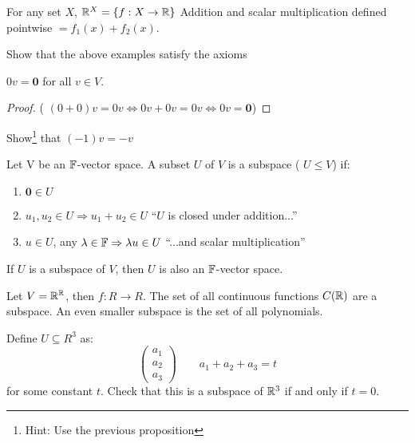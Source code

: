 \documentclass[a4paper]{article}
\begin{document}
\begin{eg}
	For any set $ X $, $ \mathbb{R}^{X} = \{ f : X \to \mathbb{R} \}$
	Addition and scalar multiplication defined pointwise $ = f_{1}(x) + f_{2} (x) $.
\end{eg}


\begin{ex}
	Show that the above examples satisfy the axioms
\end{ex}

\begin{prop} 
	$ 0 v = \mathbf{0} $ for all $ v \in V $.
\end{prop}

\begin{proof}
	( $ (0 + 0)v = 0v \iff 0 v + 0v = 0v \iff 0v = \mathbf{0} $)
\end{proof}

\begin{ex}
	Show\footnote{Hint: Use the previous proposition} that $ (-1)v = -v $
\end{ex}

\begin{defi}
	Let V be an $ \mathbb{F} $-vector space. A subset $ U $ of $ V $ is a subspace ( $ U \leq V $) if: 
	\begin{enumerate}
		\item $ \mathbf{0} \in U $
		\item $ u_{1}, u_{2} \in U  \Rightarrow u_{1} + u_{2} \in U $ ``$ U $ is closed under addition...''
		\item $ u \in U $, any $ \lambda \in \mathbb{F} \Rightarrow \lambda u \in U$ ``...and scalar multiplication''
	\end{enumerate}
\end{defi}


\begin{ex}
	If $ U $ is a subspace of $ V $, then $ U $ is also an $ \mathbb{F} $-vector space.
\end{ex}

\begin{eg}
	Let $ V = \mathbb{R}^{\mathbb{R}} $, then $ f : R \to R $. The set of all continuous functions $ C(\mathbb{R}) $ are a subspace. An even smaller subspace is the set of all polynomials.
\end{eg}


\begin{ex} Define $ U \subseteq R^{3} $ as: 
	\[ \begin{pmatrix}
a_{1} \\
a_{2} \\
a_{3}
\end{pmatrix} \qquad a_{1} + a_{2} + a_{3} = t \]
for some constant  $ t $. 
Check that this is a subspace of $ \mathbb{R}^{3} $ if and only if $ t = 0 $.
\end{ex}
\end{document}
